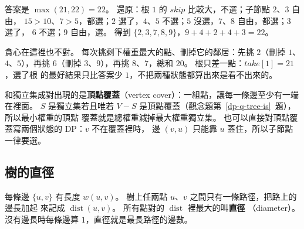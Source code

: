 答案是 $\max(21, 22) = 22$。 還原：根 $1$ 的 $\mathit{skip}$ 比較大，不選；子節點 $2$、$3$ 自由，
$15 > 10$、$7 > 5$，都選；$2$ 選了，$4$、$5$ 不選；$5$ 沒選，$7$、$8$ 自由，都選；$3$ 選了，
$6$ 不選；$9$ 自由，選。 得到 $\{2, 3, 7, 8, 9\}$，$9 + 4 + 2 + 4 + 3 = 22$。

貪心在這裡也不對。 每次挑剩下權重最大的點、刪掉它的鄰居：先挑 $2$（刪掉 $1$、$4$、$5$），再挑
$6$（刪掉 $3$、$9$），再挑 $8$、$7$，總和 $20$。 根只差一點：$\mathit{take}[1] = 21$，選了根
的最好結果只比答案少 $1$，不把兩種狀態都算出來是看不出來的。

和獨立集成對出現的是\textbf{頂點覆蓋}（vertex cover）：一組點，讓每一條邊至少有一端在裡面。
$S$ 是獨立集若且唯若 $V - S$ 是頂點覆蓋（觀念題第~\ref{dp-q-tree-is}~題），所以最小權重的頂點
覆蓋就是總權重減掉最大權重獨立集。 也可以直接對頂點覆蓋寫兩個狀態的 DP：$v$ 不在覆蓋裡時，
邊 $(v, u)$ 只能靠 $u$ 蓋住，所以子節點一律要選。

\subsection{樹的直徑}
\label{sec:dp-tree-diam}

每條邊 $\{u, v\}$ 有長度 $w(u, v)$。 樹上任兩點 $u$、$v$ 之間只有一條路徑，把路上的邊長加起
來記成 $\operatorname{dist}(u, v)$。 所有點對的 $\operatorname{dist}$ 裡最大的叫\textbf{直徑}
（diameter）。 沒有邊長時每條邊算 $1$，直徑就是最長路徑的邊數。

\begin{center}
\begin{minipage}{\linewidth}
\centering
{}
\label{fig:dp-tree-diam}
\end{minipage}
\end{center}


